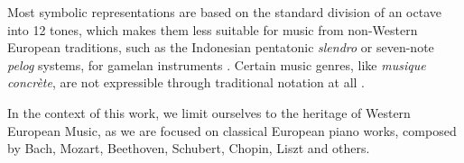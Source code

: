 Most symbolic representations are based on the standard division of an octave into 12 tones, which makes them less suitable for music from non-Western European traditions, such as the Indonesian pentatonic \emph{slendro} or seven-note \emph{pelog} systems, for gamelan instruments \cite[p.~73]{Sethares2005}. Certain music genres, like \emph{musique concrète}, are not expressible through traditional notation at all \cite[p.~69--77]{Schaeffer2012}.

In the context of this work, we limit ourselves to the heritage of Western European Music, as we are focused on classical European piano works, composed by Bach, Mozart, Beethoven, Schubert, Chopin, Liszt and others.
